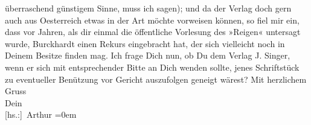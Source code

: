 \begin{ledgroupsized}[t]{13cm}
               überraschend günstigem Sinne, muss ich sagen); und da der Verlag doch gern auch aus
                  Oesterreich etwas in der Art möchte vorweisen
               können, so fiel mir ein, dass vor Jahren, als dir einmal die öffentliche Vorlesung
               des »Reigen« untersagt wurde, Burckhardt einen Rekurs eingebracht hat, der sich vielleicht
               noch in Deinem Besitze finden mag. Ich frage Dich nun, ob Du dem Verlag J. Singer, wenn er sich {\pb}mit entsprechender
               Bitte an Dich wenden sollte, jenes Schriftstück zu eventueller Benützung vor Gericht
               auszufolgen geneigt wärest? \pend
           \pstart
           Mit herzlichem Gruss{\\[\baselineskip]}Dein{\\[\baselineskip]}\spacefill\mbox{{[}hs.:{]} Arthur}\pend
           \leftskip=0em{}\endnumbering{}\end{ledgroupsized}  \newcommand{\dateiname}{L02181}\newcommand{\titel}{Arthur Schnitzler an Hermann Bahr, 12. 6. 1914}\newcommand{\editorInnen}{ Kurt Ifkovits,  Martin Anton Müller}
      